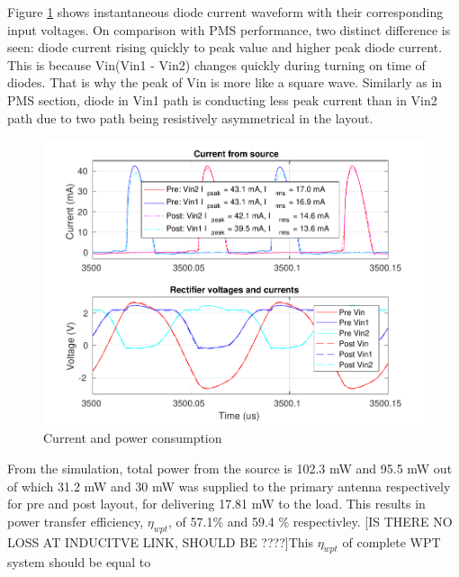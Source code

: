 \documentclass[UKenglish]{ifimaster}  %
\begin{document}
Figure \ref{fig:wpt_PI} shows instantaneous diode current waveform with their corresponding input voltages. On comparison 
with PMS performance, two distinct difference is seen: diode current rising quickly to peak value and higher peak diode 
current. This is because Vin(Vin1 - Vin2) changes quickly during turning on time of diodes. That is why the peak of Vin 
is more like a square wave. Similarly as in PMS section, diode in Vin1 path is conducting less peak current than in Vin2 path due to two 
path being resistively asymmetrical in the layout. 

\begin{figure} [H]
  \centering
  \includegraphics[width=\textwidth]{img/wpt/wpt_VIrect_both.pdf} 
 \caption{Current and power consumption} 
\label{fig:wpt_PI} 
\end{figure}
From the simulation, total power from the source is 102.3 mW and 95.5 mW out of which 31.2 mW and 30 mW was supplied to the primary 
antenna respectively for pre and post layout, for delivering 17.81 mW to the load. This results in power transfer 
efficiency, $\eta_{wpt}$, of 57.1\% and 59.4 \% respectivley. [IS THERE NO LOSS AT INDUCITVE LINK, SHOULD BE ????]This $\eta_{wpt}$ of complete WPT system should be equal to 
\end{document}

